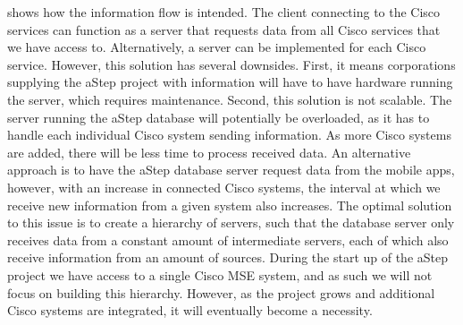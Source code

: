  shows how the information flow is intended. The client connecting to the Cisco services can function as a server that requests data from all Cisco services that we have access to. Alternatively, a server can be implemented for each Cisco service. However, this solution has several downsides. First, it means corporations supplying the aStep project with information will have to have hardware running the server, which requires maintenance. Second, this solution is not scalable. The server running the aStep database will potentially be overloaded, as it has to handle each individual Cisco system sending information. As more Cisco systems are added, there will be less time to process received data. An alternative approach is to have the aStep database server request data from the mobile apps, however, with an increase in connected Cisco systems, the interval at which we receive new information from a given system also increases. The optimal solution to this issue is to create a hierarchy of servers, such that the database server only receives data from a constant amount of intermediate servers, each of which also receive information from an amount of sources. During the start up of the aStep project we have access to a single Cisco MSE system, and as such we will not focus on building this hierarchy. However, as the project grows and additional Cisco systems are integrated, it will eventually become a necessity.

 